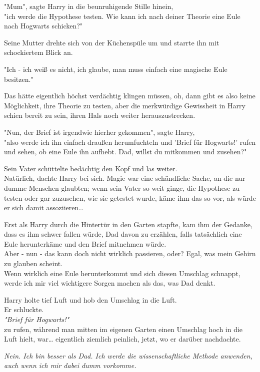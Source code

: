 {"Mum", sagte Harry in die beunruhigende Stille hinein,\\ "ich werde die Hypothese testen. Wie kann ich nach deiner Theorie eine Eule nach Hogwarts schicken?"

Seine Mutter drehte sich von der Küchenspüle um und starrte ihn mit schockiertem Blick an.

"Ich - ich weiß es nicht, ich glaube, man muss einfach eine magische Eule besitzen."

Das hätte eigentlich höchst verdächtig klingen müssen, oh, dann gibt es also keine Möglichkeit, ihre Theorie zu testen, aber die merkwürdige Gewissheit in Harry schien bereit zu sein, ihren Hals noch weiter herauszustrecken.

"Nun, der Brief ist irgendwie hierher gekommen", sagte Harry,\\ "also werde ich ihn einfach draußen herumfuchteln und 'Brief für Hogwarts!' rufen und sehen, ob eine Eule ihn aufhebt. Dad, willst du mitkommen und zusehen?"

Sein Vater schüttelte bedächtig den Kopf und las weiter.\\ Natürlich, dachte Harry bei sich. Magie war eine schändliche Sache, an die nur dumme Menschen glaubten; wenn sein Vater so weit ginge, die Hypothese zu testen oder gar zuzusehen, wie sie getestet wurde, käme ihm das so vor, als würde er sich damit assoziieren…

Erst als Harry durch die Hintertür in den Garten stapfte, kam ihm der Gedanke, dass es ihm schwer fallen würde, Dad davon zu erzählen, falls tatsächlich eine Eule herunterkäme und den Brief mitnehmen würde.\\ Aber - nun - das kann doch nicht wirklich passieren, oder? Egal, was mein Gehirn zu glauben scheint.\\ Wenn wirklich eine Eule herunterkommt und sich diesen Umschlag schnappt, werde ich mir viel wichtigere Sorgen machen als das, was Dad denkt.

Harry holte tief Luft und hob den Umschlag in die Luft.\\ Er schluckte.\\ \emph{"Brief für Hogwarts!"}\\ zu rufen, während man mitten im eigenen Garten einen Umschlag hoch in die Luft hielt, war… eigentlich ziemlich peinlich, jetzt, wo er darüber nachdachte.

\emph{Nein. Ich bin besser als Dad. Ich werde die wissenschaftliche Methode anwenden, auch wenn ich mir dabei dumm vorkomme.}

}
